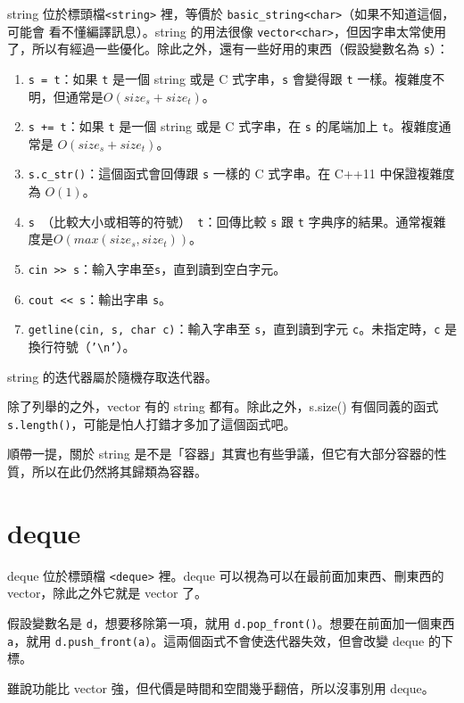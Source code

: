 \documentclass[a4paper, 11pt, oneside]{book}
\begin{document}
string 位於標頭檔\texttt{<string>} 裡，等價於 \texttt{basic\_string<char>}（如果不知道這個，可能會
看不懂編譯訊息）。string 的用法很像 \texttt{vector<char>}，但因字串太常使用了，所以有經過一些優化。除此之外，還有一些好用的東西（假設變數名為 \texttt{s}）：

\begin{enumerate}
    \item \texttt{s = t}：如果 \texttt{t} 是一個 string 或是 C 式字串，\texttt{s} 會變得跟 \texttt{t} 一樣。複雜度不明，但通常是$O(size_s + size_t)$。
    \item \texttt{s += t}：如果 \texttt{t} 是一個 string 或是 C 式字串，在 \texttt{s} 的尾端加上 \texttt{t}。複雜度通常是 $O(size_s+size_t)$。
    \item \texttt{s.c\_str()}：這個函式會回傳跟 \texttt{s} 一樣的 C 式字串。在 C++11 中保證複雜度為 $O(1)$。
    \item \texttt{s }（比較大小或相等的符號）\texttt{ t}：回傳比較 \texttt{s} 跟 \texttt{t} 字典序的結果。通常複雜度是$O(max(size_s, size_t))$。
    \item \texttt{cin >> s}：輸入字串至\texttt{s}，直到讀到空白字元。
    \item \texttt{cout << s}：輸出字串 \texttt{s}。
    \item\texttt{getline(cin, s, char c)}：輸入字串至 \texttt{s}，直到讀到字元 \texttt{c}。未指定時，\texttt{c} 是換行符號（\texttt{'\textbackslash n'}）。
\end{enumerate}

string 的迭代器屬於隨機存取迭代器。

除了列舉的之外，vector 有的 string 都有。除此之外，s.size() 有個同義的函式\texttt{s.length()}，可能是怕人打錯才多加了這個函式吧。

順帶一提，關於 string 是不是「容器」其實也有些爭議，但它有大部分容器的性質，所以在此仍然將其歸類為容器。

\section{deque}

deque 位於標頭檔 \texttt{<deque>} 裡。deque 可以視為可以在最前面加東西、刪東西的vector，除此之外它就是 vector 了。

假設變數名是 \texttt{d}，想要移除第一項，就用 \texttt{d.pop\_front()}。想要在前面加一個東西 \texttt{a}，就用 \texttt{d.push\_front(a)}。這兩個函式不會使迭代器失效，但會改變 deque 的下標。

雖說功能比 vector 強，但代價是時間和空間幾乎翻倍，所以沒事別用 deque。
\end{document}
